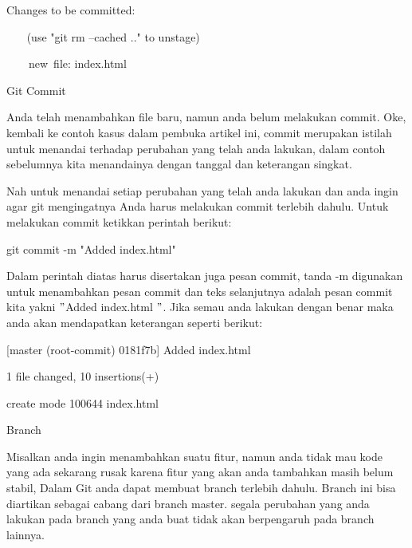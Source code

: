 \noindent 
 \hspace*{0.5in} Changes to be committed: \par
\noindent 
 \hspace*{0.5in} ~~~ (use "git rm --cached .." to unstage) \par
\noindent 
 \hspace*{0.5in} ~~~~new~file:   index.html \par
\noindent 
 \hspace*{0.5in} Git Commit \par
\noindent 
Anda telah menambahkan file baru, namun anda belum melakukan commit. Oke, kembali ke contoh kasus dalam pembuka artikel ini, commit merupakan istilah untuk menandai terhadap perubahan yang telah anda lakukan, dalam contoh sebelumnya kita menandainya dengan tanggal dan keterangan singkat.  \par
\noindent 
 \hspace*{0.5in} Nah untuk menandai setiap perubahan yang telah anda lakukan dan anda ingin agar git mengingatnya Anda harus melakukan commit terlebih dahulu. Untuk melakukan commit ketikkan perintah berikut: \par
\noindent 
 \hspace*{0.5in} git commit -m "Added index.html" \par
\noindent 
Dalam perintah diatas harus disertakan juga pesan commit, tanda -m digunakan untuk menambahkan pesan commit dan teks selanjutnya adalah pesan commit kita yakni  $ " $Added index.html $ " $. Jika semau anda lakukan dengan benar maka anda akan mendapatkan keterangan seperti berikut: \par
\noindent 
 \hspace*{0.5in} [master (root-commit) 0181f7b] Added index.html \par
\noindent 
 \hspace*{0.5in}  1 file changed, 10 insertions(+) \par
\noindent 
 \hspace*{0.5in}  create mode 100644 index.html \par
\noindent 
 \hspace*{0.5in} Branch \par
\noindent 
Misalkan anda ingin menambahkan suatu fitur, namun anda tidak mau kode yang ada sekarang rusak karena fitur yang akan anda tambahkan masih belum stabil, Dalam Git anda dapat membuat branch terlebih dahulu. Branch ini bisa diartikan sebagai cabang dari branch master. segala perubahan yang anda lakukan pada branch yang anda buat tidak akan berpengaruh pada branch lainnya. \par
